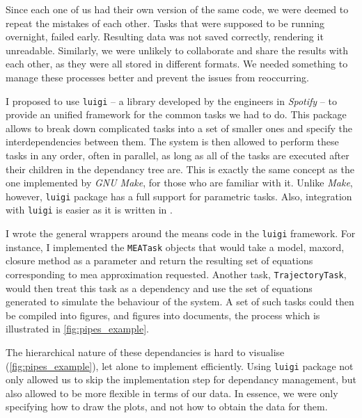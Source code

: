 Since each one of us had their own version of the same code, we were deemed to repeat the mistakes of each other. 
Tasks that were supposed to be running overnight, failed early. Resulting data was not saved correctly, rendering it unreadable.
Similarly, we were unlikely to collaborate and share the results with each other, as they were all stored in different formats.
We needed something to manage these processes better and prevent the issues from reoccurring.

I proposed to use \verb"luigi"\cite{_luigi_????} -- a \python{} library developed by the engineers in \emph{Spotify} -- to provide an unified framework for the common tasks we had to do. 
This package allows to break down complicated tasks into a set of smaller ones and specify the interdependencies between them.
The system is then allowed to perform these tasks in any order, often in parallel, as long as all of the tasks are executed after their children in the dependancy tree are.
This is exactly the same concept as the one implemented by \emph{GNU Make}\cite{gnumake}, for those who are familiar with it. Unlike \emph{Make}, however, \verb"luigi" package has a full support for parametric tasks. Also, integration with \verb"luigi" is easier as it is written in \python{}.

I wrote the general wrappers around the means code in the \verb"luigi" framework. 
For instance, I implemented the \verb"MEATask" objects that would take a model, \gls{maxord}, closure method as a parameter and return the resulting set of equations corresponding to \gls{mea} approximation requested. 
Another task, \verb"TrajectoryTask", would then treat this task as a dependency and use the set of equations generated to simulate the behaviour of the system. 
A set of such tasks could then be compiled into figures, and figures into documents, the process which is illustrated in \autoref{fig:pipes_example}.

The hierarchical nature of these dependancies is hard to visualise (\autoref{fig:pipes_example}), let alone to implement efficiently.
Using {\tt luigi} package not only allowed us to skip the implementation step for dependancy management, but also allowed to be more flexible in terms of our data. In essence, we were only specifying how to draw the plots, and not how to obtain the data for them.

